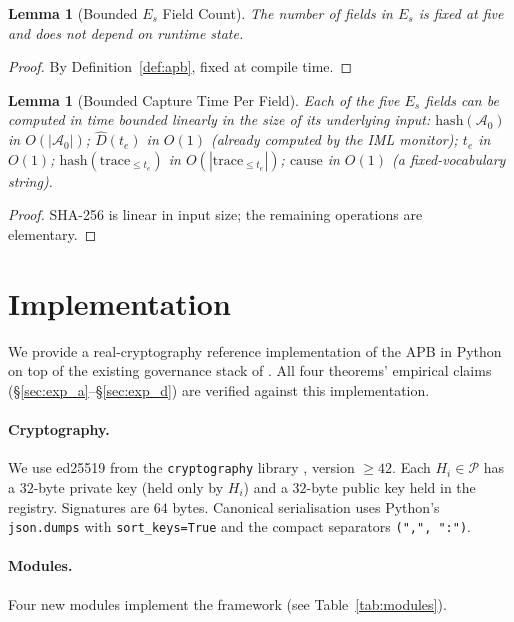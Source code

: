 \documentclass[11pt]{article}
\newtheorem{lemma}[theorem]{Lemma}
\newcommand{\Azero}{\mathcal{A}_0}
\newcommand{\Dhat}{\widehat{D}}
\newcommand{\Pset}{\mathcal{P}}
\newcommand{\Es}{E_s}
\newcommand{\Hi}{H_i}
\begin{document}
\begin{lemma}[Bounded $\Es$ Field Count]
\label{lem:bounded_count}
The number of fields in $\Es$ is fixed at five and does not depend
on runtime state.
\end{lemma}

\begin{proof}
By Definition~\ref{def:apb}, fixed at compile time.
\end{proof}

\begin{lemma}[Bounded Capture Time Per Field]
\label{lem:bounded_capture}
Each of the five $\Es$ fields can be computed in time bounded
linearly in the size of its underlying input:
$\mathrm{hash}(\Azero)$ in $O(|\Azero|)$;
$\Dhat(t_e)$ in $O(1)$ (already computed by the IML monitor);
$t_e$ in $O(1)$;
$\mathrm{hash}(\mathrm{trace}_{\le t_e})$ in $O(|\mathrm{trace}_{\le t_e}|)$;
$\mathrm{cause}$ in $O(1)$ (a fixed-vocabulary string).
\end{lemma}

\begin{proof}
SHA-256 is linear in input size; the remaining operations are
elementary.
\end{proof}

\section{Implementation}
\label{sec:impl}

We provide a real-cryptography reference implementation of the APB
in Python on top of the existing governance stack of
\citep{fernandez2026applied}. All four theorems' empirical claims
(\S\ref{sec:exp_a}--\S\ref{sec:exp_d}) are verified against this
implementation.

\paragraph{Cryptography.}
We use ed25519 from the \texttt{cryptography} library
\citep{cryptographylib}, version $\geq 42$. Each $\Hi \in \Pset$ has a
$32$-byte private key (held only by $\Hi$) and a $32$-byte public key
held in the registry. Signatures are $64$ bytes. Canonical
serialisation uses Python's \texttt{json.dumps} with
\texttt{sort\_keys=True} and the compact separators
\texttt{(",", ":")}.

\paragraph{Modules.}
Four new modules implement the framework
(see Table~\ref{tab:modules}).
\end{document}
